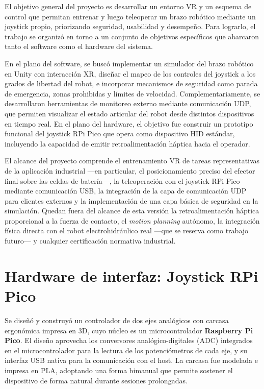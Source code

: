 El objetivo general del proyecto es desarrollar un entorno VR y un esquema de control que permitan entrenar y luego teleoperar un brazo robótico mediante un joystick propio, priorizando seguridad, usabilidad y desempeño. Para lograrlo, el trabajo se organizó en torno a un conjunto de objetivos específicos que abarcaron tanto el software como el hardware del sistema.

En el plano del software, se buscó implementar un simulador del brazo robótico en Unity con interacción XR, diseñar el mapeo de los controles del joystick a los grados de libertad del robot, e incorporar mecanismos de seguridad como parada de emergencia, zonas prohibidas y límites de velocidad. Complementariamente, se desarrollaron herramientas de monitoreo externo mediante comunicación UDP, que permiten visualizar el estado articular del robot desde distintos dispositivos en tiempo real. En el plano del hardware, el objetivo fue construir un prototipo funcional del joystick RPi Pico que opera como dispositivo HID estándar, incluyendo la capacidad de emitir retroalimentación háptica hacia el operador.

El alcance del proyecto comprende el entrenamiento VR de tareas representativas de la aplicación industrial ---en particular, el posicionamiento preciso del efector final sobre las celdas de batería---, la teleoperación con el joystick RPi Pico mediante comunicación USB, la integración de la capa de comunicación UDP para clientes externos y la implementación de una capa básica de seguridad en la simulación. Quedan fuera del alcance de esta versión la retroalimentación háptica proporcional a la fuerza de contacto, el \textit{motion planning} autónomo, la integración física directa con el robot electrohidráulico real ---que se reserva como trabajo futuro--- y cualquier certificación normativa industrial.


\section{Hardware de interfaz: Joystick RPi Pico}

Se diseñó y construyó un controlador de dos ejes analógicos con carcasa ergonómica impresa en 3D, cuyo núcleo es un microcontrolador \textbf{Raspberry Pi Pico}. El diseño aprovecha los conversores analógico-digitales (ADC) integrados en el microcontrolador para la lectura de los potenciómetros de cada eje, y su interfaz USB nativa para la comunicación con el host. La carcasa fue modelada e impresa en PLA, adoptando una forma bimanual que permite sostener el dispositivo de forma natural durante sesiones prolongadas.

